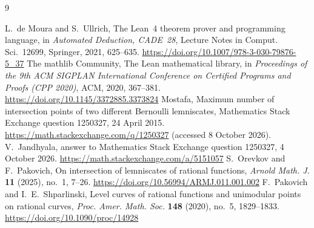 \documentclass[11pt]{amsart}
\theoremstyle{remark}\newtheorem{remark}[theorem]{Remark}
\theoremstyle{definition}\newtheorem{example}[theorem]{Example}
\begin{document}
\begin{thebibliography}{9}

 L.~de Moura and S.~Ullrich, The Lean~4 theorem prover and programming language, in \emph{Automated
Deduction, CADE~28}, Lecture Notes in Comput. Sci.~12699, Springer, 2021, 625--635.
\url{https://doi.org/10.1007/978-3-030-79876-5_37}
 The mathlib Community, The Lean mathematical library, in \emph{Proceedings of the 9th ACM SIGPLAN
International Conference on Certified Programs and Proofs (CPP 2020)}, ACM, 2020, 367--381.
\url{https://doi.org/10.1145/3372885.3373824}
 Mostafa, Maximum number of intersection points of two different Bernoulli lemniscates, Mathematics
Stack Exchange question 1250327, 24 April 2015. \url{https://math.stackexchange.com/q/1250327} (accessed 8 October
2026).
 V.~Jandhyala, answer to Mathematics Stack Exchange question 1250327, 4 October 2026.
\url{https://math.stackexchange.com/a/5151057}
 S.~Orevkov and F.~Pakovich, On intersection of lemniscates of rational functions, \emph{Arnold Math. J.}
\textbf{11} (2025), no.~1, 7--26. \url{https://doi.org/10.56994/ARMJ.011.001.002}
 F.~Pakovich and I.~E.~Shparlinski, Level curves of rational functions and unimodular points on rational
curves, \emph{Proc. Amer. Math. Soc.} \textbf{148} (2020), no.~5, 1829--1833.
\url{https://doi.org/10.1090/proc/14928}
\end{thebibliography}
\end{document}
